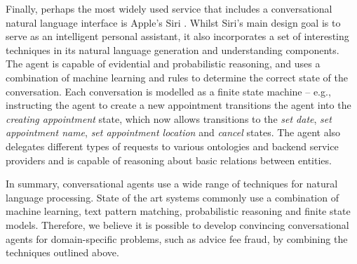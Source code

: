 Finally, perhaps the most widely used service that includes a conversational natural language interface is Apple's Siri \cite{P12}. Whilst Siri's main design goal is to serve as an intelligent personal assistant, it also incorporates a set of interesting techniques in its natural language generation and understanding components. The agent is capable of evidential and probabilistic reasoning, and uses a combination of machine learning and rules to determine the correct state of the conversation. Each conversation is modelled as a finite state machine -- e.g., instructing the agent to create a new appointment transitions the agent into the \textit{creating appointment} state, which now allows transitions to the \textit{set date}, \textit{set appointment name}, \textit{set appointment location} and \emph{cancel} states. The agent also delegates different types of requests to various ontologies and backend service providers and is capable of reasoning about basic relations between entities.

In summary, conversational agents use a wide range of techniques for natural language processing. State of the art systems commonly use a combination of machine learning, text pattern matching, probabilistic reasoning and finite state models. Therefore, we believe it is possible to develop convincing conversational agents for domain-specific problems, such as advice fee fraud, by combining the techniques outlined above.